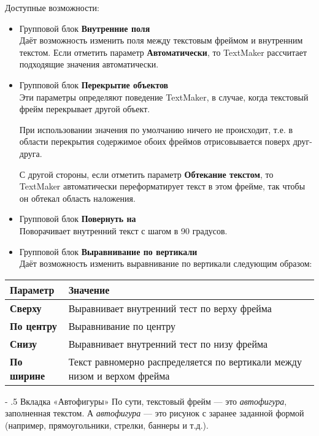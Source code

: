 ﻿\documentclass[a4paper,10pt]{article}
\makeatletter
\renewcommand\paragraph{%
   \@startsection{paragraph}{4}{0mm}%
      {-\baselineskip}%
      {.5\baselineskip}%
      {\normalfont\normalsize\bfseries}}
\makeatother
\begin{document}
Доступные возможности:

\begin{itemize}
 \item Групповой блок \textbf{Внутренние поля}\\
 Даёт возможность изменить поля между текстовым фреймом и внутренним текстом. Если отметить параметр \textbf{Автоматически}, то TextMaker рассчитает подходящие значения автоматически.
 \item Групповой блок \textbf{Перекрытие объектов}\\
 Эти параметры определяют поведение TextMaker, в случае, когда текстовый фрейм перекрывает другой объект.
 
 При использовании значения по умолчанию ничего не происходит, т.е. в области перекрытия содержимое обоих фреймов отрисовывается поверх друг-друга.
 
 С другой стороны, если отметить параметр \textbf{Обтекание текстом}, то TextMaker автоматически переформатирует текст в этом фрейме, так чтобы он обтекал область наложения.
 \item Групповой блок \textbf{Повернуть на}\\
 Поворачивает внутренний текст с шагом в 90 градусов.
 \item Групповой блок \textbf{Выравнивание по вертикали}\\
 Даёт возможность изменить выравнивание по вертикали следующим образом:
\end{itemize}

\begin{center}
\begin{tabular}{  m{4cm}  m{12cm}  }
 \textbf{Параметр} & \textbf{Значение}\\ 
 \hline
  \textbf{Сверху} & Выравнивает внутренний тест по верху фрейма\\
  \textbf{По центру} & Выравнивание по центру\\ 
\textbf{Снизу} & Выравнивает внутренний тест по низу фрейма\\
\textbf{По ширине} & Текст равномерно распределяется по вертикали между низом и верхом фрейма\\
\end{tabular}
\end{center}

\paragraph{Вкладка «Автофигуры»}
По сути, текстовый фрейм — это \textit{автофигура}, заполненная текстом. А \textit{автофигура} — это рисунок с заранее заданной формой (например, прямоугольники, стрелки, баннеры и т.д.).
\end{document}
